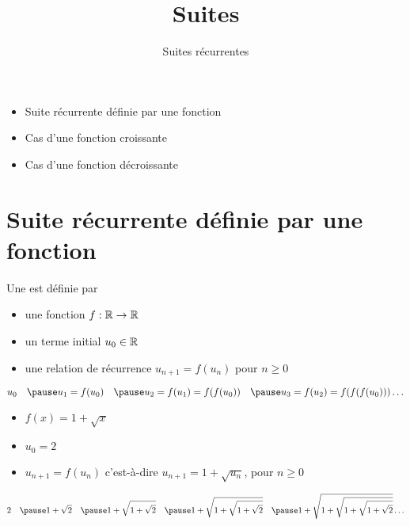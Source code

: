 






\title{{\bf Suites}}
\subtitle{Suites récurrentes}

\begin{frame}
  
  \debutmontitre

  \pause

{\footnotesize
\hfill
{}
\begin{minipage}{0.6\textwidth}
  \begin{itemize}
    \item<3-> Suite récurrente définie par une fonction
    \item<4-> Cas d'une fonction croissante
    \item<5-> Cas d'une fonction décroissante
  \end{itemize}
\end{minipage}
}



\end{frame}

\setcounter{framenumber}{0}


\section{Suite récurrente définie par une fonction}

\begin{frame}
Une  est définie par 
\pause
\begin{itemize}
  \item une fonction $f : \mathbb{R} \to \mathbb{R}$ 
\pause
  \item un terme initial $u_0 \in \mathbb{R}$
\pause
  \item une relation de récurrence $u_{n+1}=f(u_n)$ pour $n \ge 0$
\end{itemize}
\pause
\medskip
$$u_0 \quad\pause u_1 = f(u_0) \quad\pause u_2 = f(u_1) =f(f(u_0)) \quad\pause u_3 = f(u_2) =f(f(f(u_0)))\ldots$$
\pause
\vspace*{-2ex}
\pause
\begin{exemple}
\begin{itemize}
  \item $f(x)=1+\sqrt{x}$
\pause  
  \item $u_0= 2$
\pause  
  \item $u_{n+1}=f(u_n)$ c'est-à-dire $u_{n+1}=1+\sqrt{u_n}$, pour $n\ge0$
\end{itemize}
\pause
{\footnotesize
$$2 \quad\pause 1+\sqrt{2} \quad\pause 1+\sqrt{1+\sqrt{2}}  \quad\pause 1+\sqrt{1+\sqrt{1+\sqrt{2}}}  \quad\pause 1+\sqrt{1+\sqrt{1+\sqrt{1+\sqrt{2}}}}\ldots$$
}
\end{exemple}

\end{frame}


